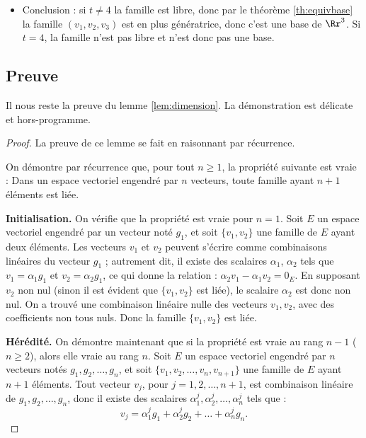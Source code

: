 \documentclass[class=report,crop=false]{standalone}
\begin{document}
\begin{exemple}
\begin{itemize}
  \item Conclusion : si $t\neq 4$ la famille est libre, donc par le théorème \ref{th:equivbase}
  la famille $(v_1,v_2,v_3)$ est en plus génératrice, donc c'est une base de $\Rr^3$.
  Si $t=4$, la famille n'est pas libre et n'est donc pas une base.
\end{itemize}

\end{exemple}

\subsection{Preuve}

Il nous reste la preuve du lemme \ref{lem:dimension}. La démonstration est délicate et hors-programme.
\begin{proof}
La preuve de ce lemme se fait en raisonnant par récurrence.

On démontre par récurrence que, pour tout $n \ge 1$, la propriété suivante est vraie :
\og Dans un espace vectoriel engendré par $n$ vecteurs,
toute famille ayant $n+1$ éléments est liée. \fg

\textbf{Initialisation.} On vérifie que la propriété est vraie pour $n=1$.
Soit $E$ un espace vectoriel engendré par un vecteur noté $g_1$,
et soit $\{v_1,v_2\}$ une famille de $E$ ayant deux éléments.
Les vecteurs $v_1$ et $v_2$ peuvent s'écrire comme combinaisons linéaires du vecteur
$g_1$ ; autrement dit, il existe des scalaires $\alpha_1$, $\alpha_2$ tels que
$v_1=\alpha_1g_1$ et $v_2=\alpha_2g_1$,
ce qui donne la relation : $\alpha_2v_1-\alpha_1v_2=0_{E}$.
En supposant $v_2$ non nul (sinon il est évident que  $\{v_1,v_2\}$ est liée),
le scalaire $\alpha_2$ est donc non nul. On a trouvé une combinaison linéaire nulle des
vecteurs $v_1,v_2$, avec des coefficients non tous nuls. Donc la famille
$\{v_1,v_2\}$ est liée.

\bigskip

\textbf{Hérédité.} On démontre maintenant que si la propriété est vraie au rang $n-1$ ($n \geq 2$),
alors elle vraie au rang $n$.
Soit $E$ un espace vectoriel engendré par $n$ vecteurs notés $g_1,g_2, \dots ,g_n$,
et soit $\{v_1,v_2, \dots ,v_n,v_{n+1}\}$ une famille de $E$ ayant $n+1$ éléments.
Tout vecteur $v_j$, pour $j=1,2,\ldots ,n+1$, est combinaison linéaire de
$g_1,g_2, \dots ,g_n$, donc il existe des scalaires
$\alpha_1^j, \alpha_2^j, \ldots, \alpha_n^j$ tels que :
$$v_j=\alpha_1^jg_1+\alpha_2^jg_2+ \dots + \alpha_n^jg_n.$$


\end{proof}
\end{document}
